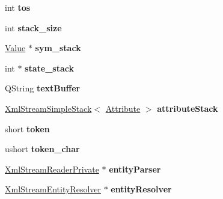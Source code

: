 \begin{DoxyCompactItemize}
int {\bfseries tos}
\item 
\mbox{\label{class_xml_stream_reader_private_a3c87435b7f5627d9141f427e635c882f}} 
int {\bfseries stack\+\_\+size}
\item 
\mbox{\label{class_xml_stream_reader_private_aa52b98ac2138fd558a052d3ec6b5d85d}} 
\hyperlink{struct_xml_stream_reader_private_1_1_value}{Value} $\ast$ {\bfseries sym\+\_\+stack}
\item 
\mbox{\label{class_xml_stream_reader_private_ab86843654fa08e94fd108f4d43a701f9}} 
int $\ast$ {\bfseries state\+\_\+stack}
\item 
\mbox{\label{class_xml_stream_reader_private_a66895cffa77806c5eaab5a481d1e277b}} 
Q\+String {\bfseries text\+Buffer}
\item 
\mbox{\label{class_xml_stream_reader_private_ad9024e0431c49bb58d9aa21de18d5f96}} 
\hyperlink{class_xml_stream_simple_stack}{Xml\+Stream\+Simple\+Stack}$<$ \hyperlink{struct_xml_stream_reader_private_1_1_attribute}{Attribute} $>$ {\bfseries attribute\+Stack}
\item 
\mbox{\label{class_xml_stream_reader_private_a3117a8ecd8395a37f80cf4c391f95443}} 
short {\bfseries token}
\item 
\mbox{\label{class_xml_stream_reader_private_a18695b49cbd26782219a56b5ffbef777}} 
ushort {\bfseries token\+\_\+char}
\item 
\mbox{\label{class_xml_stream_reader_private_a0780a69263b4f0ba02949391422e3a4d}} 
\hyperlink{class_xml_stream_reader_private}{Xml\+Stream\+Reader\+Private} $\ast$ {\bfseries entity\+Parser}
\item 
\mbox{\label{class_xml_stream_reader_private_a04564af18d6f677b7634c1e926df96af}} 
\hyperlink{class_xml_stream_entity_resolver}{Xml\+Stream\+Entity\+Resolver} $\ast$ {\bfseries entity\+Resolver}
\end{DoxyCompactItemize}
